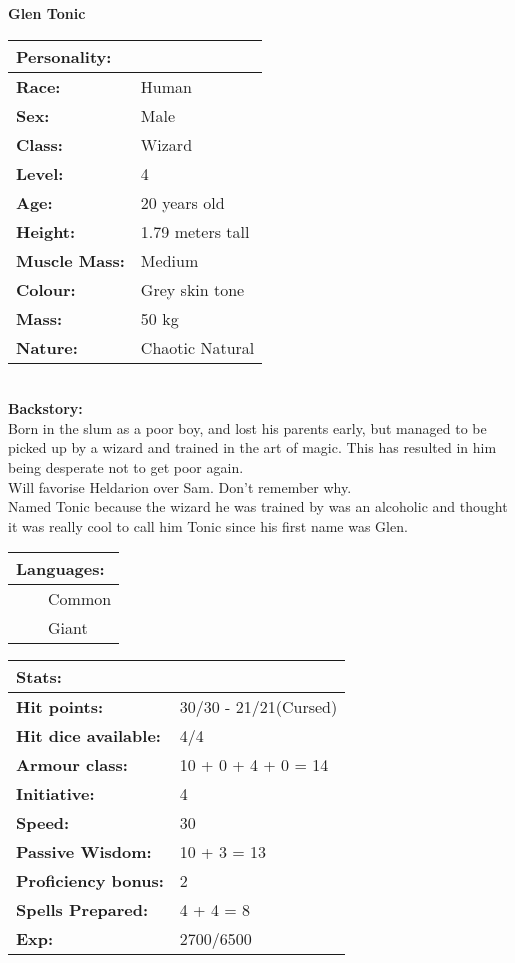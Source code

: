 \documentclass[11pt]{article}
\newcommand{\tabitem}{~~\llap{--}~~}
\begin{document}
	\begin{center}
\Huge \textbf{Glen Tonic}
	\end{center}
	\begin{multicols}{2}
\noindent \begin{tabularx}{95mm}{@{}l l}
\Large \textbf{Personality:} 	& 					\\
\hline
\textbf{Race:} 					& Human 			\\
\textbf{Sex:} 					& Male 				\\
\textbf{Class:}					& Wizard			\\
\textbf{Level:} 				& 4 	 			\\
\textbf{Age:} 					& 20 years old 		\\
\textbf{Height:} 				& 1.79 meters tall 	\\
\textbf{Muscle Mass:} 			& Medium 			\\
\textbf{Colour:} 				& Grey skin tone 	\\
\textbf{Mass:} 					& 50 kg 			\\
\textbf{Nature:} 				& Chaotic Natural
		\end{tabularx} \\
\textbf{Backstory:} \\
Born in the slum as a poor boy, and lost his parents early, but managed to be picked up by a wizard and trained in the art of magic. This has resulted in him being desperate not to get poor again. \\
Will favorise Heldarion over Sam. Don't remember why. \\
Named Tonic because the wizard he was trained by was an alcoholic and thought it was really cool to call him Tonic since his first name was Glen. \\

\noindent \begin{tabularx}{95mm}{@{}l}
{\Large \textbf{Languages:}} \\
\hline
\tabitem Common \\
\tabitem Giant
		\end{tabularx}

\vspace{4mm}

\noindent \begin{tabularx}{95mm}{@{}l l}
\Large \textbf{Stats:}		 	& 							\\
\hline
\textbf{Hit points:} 			& 30/30 - 21/21(Cursed) 	\\
\textbf{Hit dice available:}	& 4/4						\\
\textbf{Armour class:} 			& 10 + 0 + 4 + 0 = 14 		\\
\textbf{Initiative:} 			& 4	 						\\
\textbf{Speed:} 				& 30		 				\\
\textbf{Passive Wisdom:} 		& 10 + 3 = 13	 			\\
\textbf{Proficiency bonus:}		& 2							\\
\textbf{Spells Prepared:} 		& 4 + 4 = 8		 			\\
\textbf{Exp:} 					& 2700/6500
		\end{tabularx}


\end{multicols}
\end{document}
